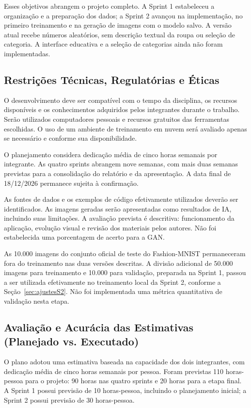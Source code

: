 \documentclass[12pt,a4paper]{article}
\begin{document}
Esses objetivos abrangem o projeto completo. A Sprint 1 estabeleceu a organização e a preparação dos dados; a Sprint 2 avançou na implementação, no primeiro treinamento e na geração de imagens com o modelo salvo. A versão atual recebe números aleatórios, sem descrição textual da roupa ou seleção de categoria. A interface educativa e a seleção de categorias ainda não foram implementadas.

\subsection{Restrições Técnicas, Regulatórias e Éticas}
O desenvolvimento deve ser compatível com o tempo da disciplina, os recursos disponíveis e os conhecimentos adquiridos pelos integrantes durante o trabalho. Serão utilizados computadores pessoais e recursos gratuitos das ferramentas escolhidas. O uso de um ambiente de treinamento em nuvem será avaliado apenas se necessário e conforme sua disponibilidade.

O planejamento considera dedicação média de cinco horas semanais por integrante. As quatro sprints abrangem nove semanas, com mais duas semanas previstas para a consolidação do relatório e da apresentação. A data final de 18/12/2026 permanece sujeita à confirmação.

As fontes de dados e os exemplos de código efetivamente utilizados deverão ser identificados. As imagens geradas serão apresentadas como resultados de IA, incluindo suas limitações. A avaliação prevista é descritiva: funcionamento da aplicação, evolução visual e revisão dos materiais pelos autores. Não foi estabelecida uma porcentagem de acerto para a GAN.

As 10.000 imagens do conjunto oficial de teste do Fashion-MNIST permaneceram fora do treinamento nas duas versões descritas. A divisão adicional de 50.000 imagens para treinamento e 10.000 para validação, preparada na Sprint 1, passou a ser utilizada efetivamente no treinamento local da Sprint 2, conforme a Seção~\ref{sec:ajustesS2}. Não foi implementada uma métrica quantitativa de validação nesta etapa.

\subsection{Avaliação e Acurácia das Estimativas (Planejado vs. Executado)}
\label{sec:estimativas}
O plano adotou uma estimativa baseada na capacidade dos dois integrantes, com dedicação média de cinco horas semanais por pessoa. Foram previstas 110 horas-pessoa para o projeto: 90 horas nas quatro sprints e 20 horas para a etapa final. A Sprint 1 possui previsão de 10 horas-pessoa, incluindo o planejamento inicial; a Sprint 2 possui previsão de 30 horas-pessoa.
\end{document}
